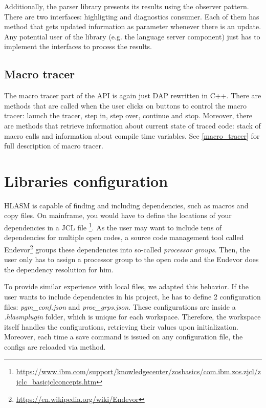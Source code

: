 Additionally, the parser library presents its results using the observer pattern. There are two interfaces: highligting and diagnostics consumer. Each of them has method  that gets updated information as parameter whenever there is an update. Any potential user of the library (e.g. the language server component) just has to implement the interfaces to process the results.

\subsection{Macro tracer}

The macro tracer part of the API is again just DAP rewritten in C++. There are methods that are called when the user clicks on buttons to control the macro tracer: launch the tracer, step in, step over, continue and stop. Moreover, there are methods that retrieve information about current state of traced code: stack of macro calls and information about compile time variables. See \cref{macro_tracer} for full description of macro tracer.

\section{Libraries configuration}
\label{libs_config}
HLASM is capable of finding and including dependencies, such as macros and copy files. On mainframe, you would have to define the locations of your dependencies in a JCL file \footnote{\url{https://www.ibm.com/support/knowledgecenter/zosbasics/com.ibm.zos.zjcl/zjclc_basicjclconcepts.htm}}. As the user may want to include tens of dependencies for multiple open codes, a source code management tool called Endevor\footnote{\url{https://en.wikipedia.org/wiki/Endevor}} groups these dependencies into so-called \emph{processor groups}. Then, the user only has to assign a processor group to the open code and the Endevor does the dependency resolution for him.

To provide similar experience with local files, we adapted this behavior. If the user wants to include dependencies in his project, he has to define 2 configuration files: \emph{pgm\_conf.json} and \emph{proc\_grps.json}. These configurations are inside a \emph{.hlasmplugin} folder, which is unique for each workspace. Therefore, the workspace itself handles the configurations, retrieving their values upon initialization. Moreover, each time a save command is issued on any configuration file, the configs are reloaded via  method.

